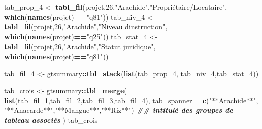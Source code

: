 \documentclass[
]{article}
\newenvironment{Shaded}{\begin{snugshade}}{\end{snugshade}}
\newcommand{\AttributeTok}[1]{\textcolor[rgb]{0.13,0.29,0.53}{#1}}
\newcommand{\DecValTok}[1]{\textcolor[rgb]{0.00,0.00,0.81}{#1}}
\newcommand{\DocumentationTok}[1]{\textcolor[rgb]{0.56,0.35,0.01}{\textbf{\textit{#1}}}}
\newcommand{\FunctionTok}[1]{\textcolor[rgb]{0.13,0.29,0.53}{\textbf{#1}}}
\newcommand{\NormalTok}[1]{#1}
\newcommand{\OtherTok}[1]{\textcolor[rgb]{0.56,0.35,0.01}{#1}}
\newcommand{\SpecialCharTok}[1]{\textcolor[rgb]{0.81,0.36,0.00}{\textbf{#1}}}
\newcommand{\StringTok}[1]{\textcolor[rgb]{0.31,0.60,0.02}{#1}}
\begin{document}
\begin{Shaded}
\begin{Highlighting}[]
\NormalTok{tab\_prop\_4 }\OtherTok{\textless{}{-}} \FunctionTok{tabl\_fil}\NormalTok{(projet,}\DecValTok{26}\NormalTok{,}\StringTok{"Arachide"}\NormalTok{,}\StringTok{"Propriétaire/Locataire"}\NormalTok{,}
                       \FunctionTok{which}\NormalTok{(}\FunctionTok{names}\NormalTok{(projet)}\SpecialCharTok{==}\StringTok{"q81"}\NormalTok{))}
\NormalTok{tab\_niv\_4 }\OtherTok{\textless{}{-}} \FunctionTok{tabl\_fil}\NormalTok{(projet,}\DecValTok{26}\NormalTok{,}\StringTok{"Arachide"}\NormalTok{,}\StringTok{"Niveau d\textquotesingle{}instruction"}\NormalTok{,}
                      \FunctionTok{which}\NormalTok{(}\FunctionTok{names}\NormalTok{(projet)}\SpecialCharTok{==}\StringTok{"q25"}\NormalTok{))}
\NormalTok{tab\_stat\_4 }\OtherTok{\textless{}{-}} \FunctionTok{tabl\_fil}\NormalTok{(projet,}\DecValTok{26}\NormalTok{,}\StringTok{"Arachide"}\NormalTok{,}\StringTok{"Statut juridique"}\NormalTok{,}
                       \FunctionTok{which}\NormalTok{(}\FunctionTok{names}\NormalTok{(projet)}\SpecialCharTok{==}\StringTok{"q81"}\NormalTok{))}

\NormalTok{tab\_fil\_4 }\OtherTok{\textless{}{-}}\NormalTok{ gtsummary}\SpecialCharTok{::}\FunctionTok{tbl\_stack}\NormalTok{(}\FunctionTok{list}\NormalTok{(tab\_prop\_4, tab\_niv\_4,tab\_stat\_4))}

\NormalTok{tab\_crois }\OtherTok{\textless{}{-}}\NormalTok{ gtsummary}\SpecialCharTok{::}\FunctionTok{tbl\_merge}\NormalTok{(}
  \FunctionTok{list}\NormalTok{(tab\_fil\_1,tab\_fil\_2,tab\_fil\_3,tab\_fil\_4),}
  \AttributeTok{tab\_spanner =} \FunctionTok{c}\NormalTok{(}\StringTok{"**Arachide**"}\NormalTok{, }\StringTok{"**Anacarde**"}\NormalTok{,}\StringTok{"**Mangue**"}\NormalTok{,}\StringTok{"**Riz**"}\NormalTok{) }
  \DocumentationTok{\#\# intitulé des groupes de tableau associés}
\NormalTok{)}
\NormalTok{tab\_crois}
\end{Highlighting}
\end{Shaded}
\end{document}
